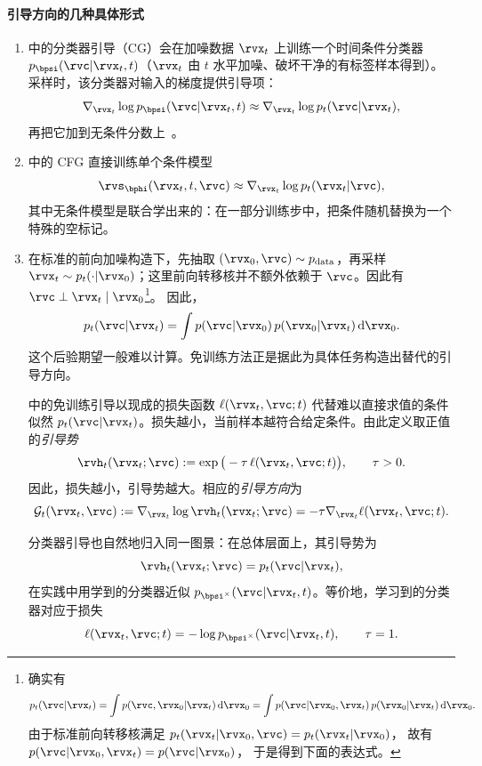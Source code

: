 \paragraph{引导方向的几种具体形式}
\begin{enumerate}[leftmargin=*]
\item {}  中的分类器引导（CG）会在加噪数据 $\rvx_t$ 上训练一个时间条件分类器
$p_{\bpsi}(\rvc | \rvx_t, t)$（$\rvx_t$ 由 $t$ 水平加噪、破坏干净的有标签样本得到）。采样时，该分类器对输入的梯度提供引导项：
\[
\nabla_{\rvx_t}\log p_{\bpsi}(\rvc | \rvx_t, t)
 \approx  \nabla_{\rvx_t}\log p_t(\rvc | \rvx_t),
\]
再把它加到无条件分数上~\citep{dhariwal2021diffusion}。
\item {}  中的 CFG 直接训练单个条件模型
\[
\rvs_{\bphi}(\rvx_t,t,\rvc) \approx \nabla_{\rvx_t}\log p_t(\rvx_t|\rvc),
\]
其中无条件模型是联合学出来的：在一部分训练步中，把条件随机替换为一个特殊的空标记。
\item {}
在标准的前向加噪构造下，先抽取
$(\rvx_0,\rvc)\sim p_{\mathrm{data}}$，再采样
$\rvx_t\sim p_t(\cdot|\rvx_0)$；这里前向转移核并不额外依赖于 $\rvc$。因此有
$\rvc\perp\rvx_t\mid\rvx_0$\footnote{
确实有
\[
p_t(\rvc|\rvx_t)
=
\int
p(\rvc,\rvx_0|\rvx_t)\,\mathrm d\rvx_0
=
\int
p(\rvc|\rvx_0,\rvx_t)\,
p(\rvx_0|\rvx_t)\,\mathrm d\rvx_0.
\]
由于标准前向转移核满足
$p_t(\rvx_t|\rvx_0,\rvc)=p_t(\rvx_t|\rvx_0)$，
故有
$p(\rvc|\rvx_0,\rvx_t)=p(\rvc|\rvx_0)$，
于是得到下面的表达式。
}。
因此，
\[
p_t(\rvc|\rvx_t)
=
\int
p(\rvc|\rvx_0)\,
p(\rvx_0|\rvx_t)\,
\mathrm d\rvx_0.
\]
这个后验期望一般难以计算。免训练方法正是据此为具体任务构造出替代的引导方向。

 中的免训练引导以现成的损失函数 $\ell(\rvx_t,\rvc;t)$ 代替难以直接求值的条件似然 $p_t(\rvc|\rvx_t)$。损失越小，当前样本越符合给定条件。由此定义取正值的\emph{引导势}
\[
\rvh_t(\rvx_t;\rvc)
:=
\exp\big(-\tau\,\ell(\rvx_t,\rvc;t)\big),
\qquad \tau>0.
\]
因此，损失越小，引导势越大。相应的\emph{引导方向}为
\[
\mathcal{G}_t(\rvx_t,\rvc)
:=
\nabla_{\rvx_t}\log \rvh_t(\rvx_t;\rvc)
=
-\tau\nabla_{\rvx_t}\ell(\rvx_t,\rvc;t).
\]

分类器引导也自然地归入同一图景：在总体层面上，其引导势为
\[
\rvh_t(\rvx_t;\rvc)
=
p_t(\rvc|\rvx_t),
\]
在实践中用学到的分类器近似
$p_{\bpsi^\times}(\rvc|\rvx_t,t)$。等价地，学习到的分类器对应于损失
\[
\ell(\rvx_t,\rvc;t)
=
-\log p_{\bpsi^\times}(\rvc|\rvx_t,t),
\qquad \tau=1.
\]


\end{enumerate}

